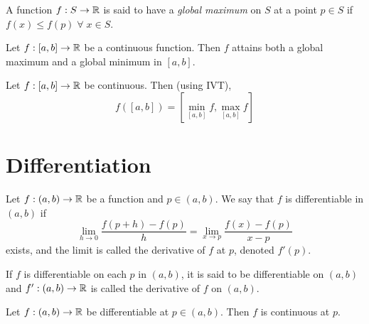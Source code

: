 \documentclass[12pt]{article}
\begin{document}
\begin{defn} \label{defn:global extrema}
    A function $f : S \to \mathbb{R}$ is said to have a \emph{global maximum} on $S$ at a point $p \in S$ if $f(x) \leq f(p) \;\forall\; x \in S$.
\end{defn}

\begin{thm} \label{thm:extreme value}
    Let $f : [a, b] \to \mathbb{R}$ be a continuous function. Then $f$ attains both a global maximum and a global minimum in $[a, b]$.
\end{thm}

\begin{cor} \label{cor:continuous fn range}
    Let $f : [a, b] \to \mathbb{R}$ be continuous. Then (using IVT), \[
        f([a, b]) = [\min_{[a, b]} f, \max_{[a, b]} f]
    \]
\end{cor}

\section{Differentiation}

\begin{defn} \label{defn:dv}
    Let $f : (a, b) \to \mathbb{R}$ be a function and $p \in (a, b)$. We say that $f$ is differentiable in $(a, b)$ if \[
        \lim_{h \to 0} \frac{f(p + h) - f(p)}{h} = \lim_{x \to p} \frac{f(x) - f(p)}{x - p}
    \] exists, and the limit is called the derivative of $f$ at $p$, denoted $f'(p)$.

    If $f$ is differentiable on each $p$ in $(a, b)$, it is said to be differentiable on $(a, b)$ and $f' : (a, b) \to \mathbb{R}$ is called the derivative of $f$ on $(a, b)$.
\end{defn}

\begin{thm} \label{thm:diff=>cont}
    Let $f : (a, b) \to \mathbb{R}$ be differentiable at $p \in (a, b)$. Then $f$ is continuous at $p$.
\end{thm}

\begin{thm} \label{thm:dv algebra}
    
\end{thm}
\end{document}
